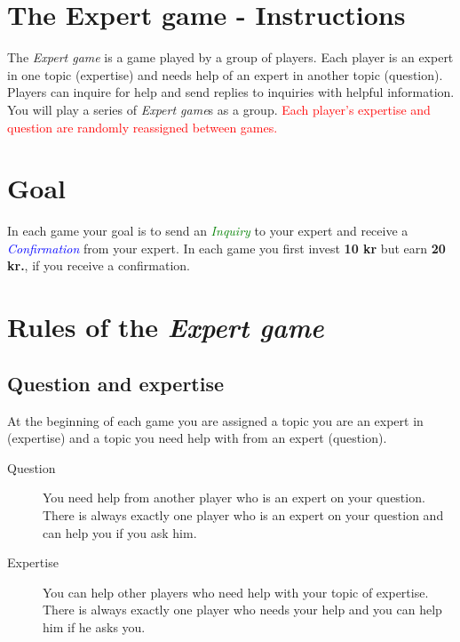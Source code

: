 \documentclass[a4paper,10pt]{article}
\newcommand{\ActionI}[0]{\action{green}{Inquiry} }
\newcommand{\ActionC}[0]{\action{blue}{Confirmation} }
\newcommand{\action}[2]{\textcolor{#1}{\emph{{#2}}}}
\newcommand{\Money}[1]{\textcolor[rgb]{0.7,0.7,0}{\textbf{{#1}}}}
\begin{document}
 \section*{The Expert game - Instructions}
 The \emph{Expert game} is a game played by a group of players. Each player is an expert in one topic (expertise) and needs help of an expert in another topic (question). Players can inquire for help and send replies to inquiries with helpful information.
 You will play a series of \emph{Expert game}s as a group. \textcolor{red}{Each player's expertise and question are randomly reassigned between games.}
  \section*{Goal}
 In each game your goal is to send an \ActionI to your expert and receive a \ActionC from your expert. In each game you first invest \Money{10 kr} but earn \Money{20 kr.}, if you receive a confirmation.
 \section{Rules of the \emph{Expert game}}
\subsection{Question and expertise}
 At the beginning of each game you are assigned a topic you are an expert in (expertise) and a topic you need help with from an expert (question).
 \begin{description}
  \item[Question] You need help from another player who is an expert on your question. There is always exactly one player who is an expert on your question and can help you if you ask him.
  \item[Expertise] You can help other players who need help with your topic of expertise. There is always exactly one player who needs your help and you can help him if he asks you.
 \end{description}
\end{document}
